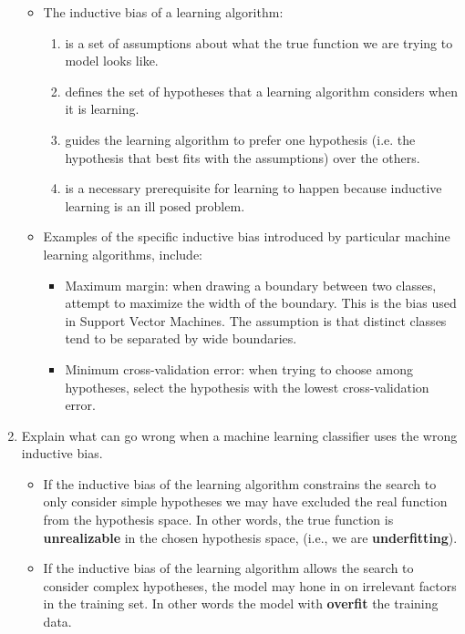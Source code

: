 \documentclass[--SOLUTION-OPTION--]{ditpaper}
\begin{document}
\begin{enumerate}
\begin{answer}
		\begin{itemize}
				\item The inductive bias of a learning algorithm:
				\begin{enumerate}
					\item is a set of assumptions about what the true function we are trying to model looks like.
					\item defines the set of hypotheses that a learning algorithm considers when it is learning.
					\item guides the learning algorithm to prefer one hypothesis (i.e. the hypothesis that best fits with the assumptions) over the others. 
					\item is a necessary prerequisite for learning to happen because inductive learning is an ill posed problem. 
				\end{enumerate}	
				\item Examples of the specific inductive bias introduced by particular machine learning algorithms, include:		
				\begin{itemize}
					\item Maximum margin: when drawing a boundary between two classes, attempt to maximize the width of the boundary. This is the bias used in Support Vector Machines. The assumption is that distinct classes tend to be separated by wide boundaries.
					\item Minimum cross-validation error: when trying to choose among hypotheses, select the hypothesis with the lowest cross-validation error.
				\end{itemize}
			\end{itemize}
	\end{answer}

	\item Explain what can go wrong when a machine learning classifier uses the wrong inductive bias.
\begin{answer}
			\begin{itemize}
				\item If the inductive bias of the learning algorithm constrains the search to only consider simple hypotheses we may have excluded the real function from the hypothesis space. In other words, the true function is \textbf{unrealizable} in the chosen hypothesis space, (i.e., we are \textbf{underfitting}). 
				\item If the inductive bias of the learning algorithm allows the search to consider complex hypotheses, the model may hone in on irrelevant factors in the training set. In other words the model with \textbf{overfit} the training data.
			\end{itemize}
\end{answer}


\end{enumerate}
\end{document}
